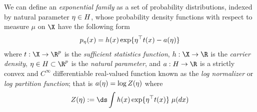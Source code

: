 \begin{definition}
We can define an \textit{exponential family} as a set of probability distributions, indexed by natural parameter $\eta \in H$,%
 whose probability density functions with respect to measure $\mu$ on $\X$ have the following form
\begin{align}
 p_\eta(x) = h(x) \exp \{ \eta^\top t(x) - a(\eta)\} 
\label{eqn:exponential_family_natural}
 \end{align}
where $\sufficientStatsFunction  : \X \to \R^p$ is the \textit{sufficient statistics function}, $\carrierDensity : \X \to \R$ is the \textit{carrier density}, $\eta \in \naturalParamSpace \subset \R^p$ is the \textit{natural parameter},  and $\logNormalizerFunction : \naturalParamSpace \to \R$ is a strictly convex and $C^{\infty}$ differentiable real-valued function known as the \textit{log normalizer} or \textit{log partition function};  that is $a(\eta) = \log Z(\eta)$ where 
\begin{equation}
\label{eqn:partition_function}
 Z(\eta) := \ds\int  \carrierDensity(x) \exp \{ \eta^\top \sufficientStatsFunction(x)  \} \; \mu(dx)	
\end{equation}



\end{definition}
